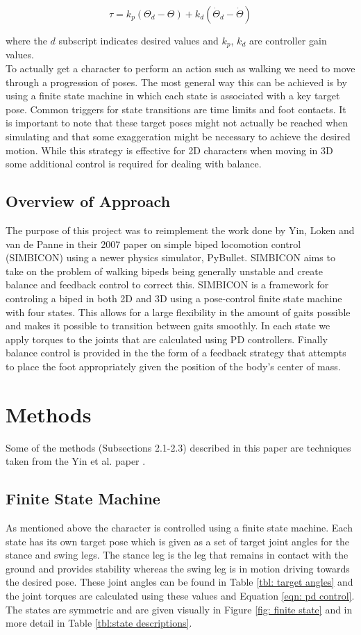 \documentclass[12pt, a4paper]{article}
\begin{document}
\begin{equation}
\tau = k_p(\Theta_d - \Theta) + k_d(\dot\Theta_d -\dot\Theta)
\label{eqn: pd control}
\end{equation} 

where the $d$ subscript indicates desired values and $k_p$, $k_d$ are controller gain values.\\

To actually get a character to perform an action such as walking we need to move through a progression of poses. The most general way this can be achieved is by using a finite state machine in which each state is associated with a key target pose. Common triggers for state transitions are time limits and foot contacts. It is important to note that these target poses might not actually be reached when simulating and that some exaggeration might be necessary to achieve the desired motion. While this strategy is effective for 2D characters when moving in 3D some additional control is required for dealing with balance.  

\subsection{Overview of Approach}
The purpose of this project was to reimplement the work done by Yin, Loken and van de Panne in their 2007 paper \cite{Yin07} on simple biped locomotion control (SIMBICON) using a newer physics simulator, PyBullet. SIMBICON aims to take on the problem of walking bipeds being generally unstable and create balance and feedback control to correct this. SIMBICON is a framework for controling a biped in both 2D and 3D using a pose-control finite state machine with four states. This allows for a large flexibility in the amount of gaits possible and makes it possible to transition between gaits smoothly. In each state we apply torques to the joints that are calculated using PD controllers. Finally balance control is provided in the  the form of a feedback strategy that attempts to place the foot appropriately given the position of the body's center of mass.  

\section{Methods}
Some of the methods (Subsections 2.1-2.3) described in this paper are techniques taken from the Yin et al. paper \cite{Yin07}. 
\subsection{Finite State Machine}
As mentioned above the character is controlled using a finite state machine. Each state has its own target pose which is given as a set of target joint angles for the stance and swing legs. The stance leg is the leg that remains in contact with the ground and provides stability whereas the swing leg is in motion driving towards the desired pose. These joint angles can be found in Table \ref{tbl: target angles} and the joint torques are calculated using these values and Equation \ref{eqn: pd control}. The states are symmetric  and are given visually in Figure \ref{fig: finite state} and in more detail in Table \ref{tbl:state descriptions}.
\end{document}
